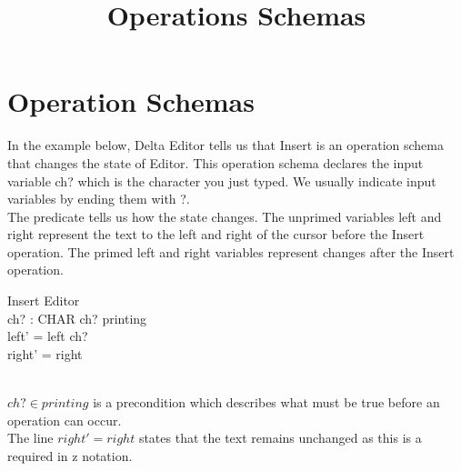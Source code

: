 \documentclass{article}
\title{Operations Schemas}
\begin{document}
\maketitle

\section{Operation Schemas}
In the example below, Delta Editor tells us that Insert is an operation schema that changes the state of Editor. This operation schema declares the input variable ch? which is the character you just typed. We usually indicate input variables by ending them with ?.\\


The predicate tells us how the state changes. The unprimed variables left and right represent the text to the left and right of the cursor before the Insert operation. The primed left and right variables represent changes after the Insert operation.

\begin{schema}{Insert}
    \Delta Editor \\
    ch? : CHAR
\where
    ch? \in printing \\
    left' = left \cat \langle ch? \rangle \\
    right' = right
\end{schema}
\\
\noindent
$ch? \in printing$ is a precondition which describes what must be true before an operation can occur.\\

\noindent
The line $right' = right$ states that the text remains unchanged as this is a required in z notation.
\end{document}

